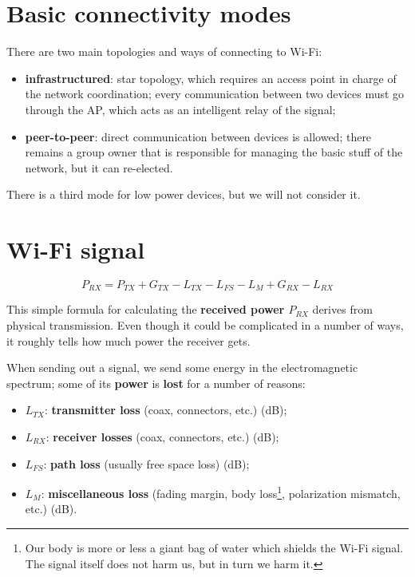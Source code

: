 
\section{Basic connectivity modes}
There are two main topologies and ways of connecting to Wi-Fi:

\begin{itemize}
    \item \textbf{infrastructured}: star topology, which requires an access point in charge of the network coordination; every communication between two devices must go through the AP, which acts as an intelligent relay of the signal;
    \item \textbf{peer-to-peer}: direct communication between devices is allowed; there remains a group owner that is responsible for managing the basic stuff of the network, but it can re-elected.
\end{itemize}

There is a third mode for low power devices, but we will not consider it.


\section{Wi-Fi signal}
\begin{equation}
\label{eq:wifi}
        P_{RX} = P_{TX} + G_{TX} - L_{TX} - L_{FS} - L_{M} + G_{RX} - L_{RX}
\end{equation}

This simple formula for calculating the \textbf{received power $P_{RX}$} derives from physical transmission. Even though it could be complicated in a number of ways, it roughly tells how much power the receiver gets.

When sending out a signal, we send some energy in the electromagnetic spectrum; some of its \textbf{power} is \textbf{lost} for a number of reasons:

\begin{itemize}
    \item \textbf{$L_{TX}$}: \textbf{transmitter loss} (coax, connectors, etc.) (dB);
    \item \textbf{$L_{RX}$}: \textbf{receiver losses} (coax, connectors, etc.) (dB);
    \item \textbf{$L_{FS}$}: \textbf{path loss} (usually free space loss) (dB);
    \item \textbf{$L_{M}$}: \textbf{miscellaneous loss} (fading margin, body loss\footnote{Our body is more or less a giant bag of water which shields the Wi-Fi signal. The signal itself does not harm us, but in turn we harm it.}, polarization mismatch, etc.) (dB).
\end{itemize}

